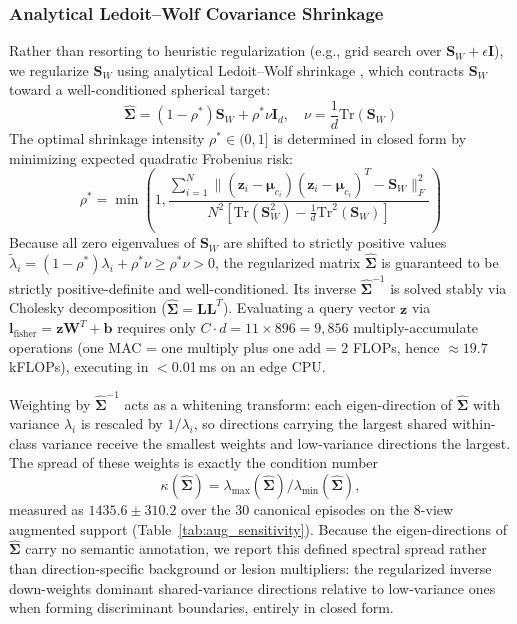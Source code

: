 \documentclass[preprint,12pt]{elsarticle}
\begin{document}
\subsubsection{Analytical Ledoit--Wolf Covariance Shrinkage}
\label{sec:shrinkage}
Rather than resorting to heuristic regularization (e.g., grid search over $\mathbf{S}_W + \epsilon \mathbf{I}$), we regularize $\mathbf{S}_W$ using analytical Ledoit--Wolf shrinkage \cite{ledoit2004well}, which contracts $\mathbf{S}_W$ toward a well-conditioned spherical target:
\begin{equation}
    \hat{\mathbf{\Sigma}} = (1 - \rho^*)\mathbf{S}_W + \rho^* \nu \mathbf{I}_{d}, \quad \nu = \frac{1}{d}\text{Tr}(\mathbf{S}_W)
    \label{eq:lw_target}
\end{equation}
The optimal shrinkage intensity $\rho^* \in (0, 1]$ is determined in closed form by minimizing expected quadratic Frobenius risk:
\begin{equation}
    \rho^* = \min\left(1, \frac{\sum_{i=1}^N \|(\mathbf{z}_i - \boldsymbol{\mu}_{c_i})(\mathbf{z}_i - \boldsymbol{\mu}_{c_i})^T - \mathbf{S}_W\|_F^2}{N^2 \left[\text{Tr}(\mathbf{S}_W^2) - \frac{1}{d}\text{Tr}^2(\mathbf{S}_W)\right]}\right)
    \label{eq:lw_shrinkage}
\end{equation}
Because all zero eigenvalues of $\mathbf{S}_W$ are shifted to strictly positive values $\tilde{\lambda}_i = (1 - \rho^*)\lambda_i + \rho^* \nu \ge \rho^* \nu > 0$, the regularized matrix $\hat{\mathbf{\Sigma}}$ is guaranteed to be strictly positive-definite and well-conditioned. Its inverse $\hat{\mathbf{\Sigma}}^{-1}$ is solved stably via Cholesky decomposition ($\hat{\mathbf{\Sigma}} = \mathbf{L}\mathbf{L}^T$). Evaluating a query vector $\mathbf{z}$ via $\mathbf{l}_{\text{fisher}} = \mathbf{z}\mathbf{W}^T + \mathbf{b}$ requires only $C \cdot d = 11 \times 896 = 9{,}856$ multiply-accumulate operations (one MAC = one multiply plus one add = 2 FLOPs, hence $\approx 19.7$\,kFLOPs), executing in $<$0.01\,ms on an edge CPU.

Weighting by $\hat{\mathbf{\Sigma}}^{-1}$ acts as a whitening transform: each eigen-direction of $\hat{\mathbf{\Sigma}}$ with variance $\lambda_i$ is rescaled by $1/\lambda_i$, so directions carrying the largest shared within-class variance receive the smallest weights and low-variance directions the largest. The spread of these weights is exactly the condition number
\begin{equation}
    \kappa(\hat{\mathbf{\Sigma}}) = \lambda_{\max}(\hat{\mathbf{\Sigma}}) / \lambda_{\min}(\hat{\mathbf{\Sigma}}),
    \label{eq:whitening_spread}
\end{equation}
measured as $1435.6 \pm 310.2$ over the 30 canonical episodes on the 8-view augmented support (Table~\ref{tab:aug_sensitivity}). Because the eigen-directions of $\hat{\mathbf{\Sigma}}$ carry no semantic annotation, we report this defined spectral spread rather than direction-specific background or lesion multipliers: the regularized inverse down-weights dominant shared-variance directions relative to low-variance ones when forming discriminant boundaries, entirely in closed form.
\end{document}
